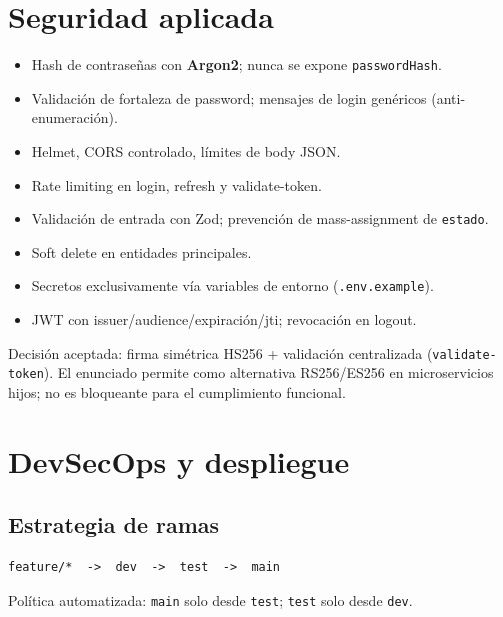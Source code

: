 \documentclass[12pt,a4paper]{article}
\begin{document}
\section{Seguridad aplicada}
\begin{itemize}[leftmargin=1.5em]
  \item Hash de contraseñas con \textbf{Argon2}; nunca se expone \texttt{passwordHash}.
  \item Validación de fortaleza de password; mensajes de login genéricos
        (anti-enumeración).
  \item Helmet, CORS controlado, límites de body JSON.
  \item Rate limiting en login, refresh y validate-token.
  \item Validación de entrada con Zod; prevención de mass-assignment de
        \texttt{estado}.
  \item Soft delete en entidades principales.
  \item Secretos exclusivamente vía variables de entorno (\texttt{.env.example}).
  \item JWT con issuer/audience/expiración/jti; revocación en logout.
\end{itemize}

Decisión aceptada: firma simétrica HS256 + validación centralizada
(\texttt{validate-token}). El enunciado permite como alternativa RS256/ES256
en microservicios hijos; no es bloqueante para el cumplimiento funcional.

\section{DevSecOps y despliegue}
\subsection{Estrategia de ramas}
\begin{lstlisting}
feature/*  ->  dev  ->  test  ->  main
\end{lstlisting}
Política automatizada: \texttt{main} solo desde \texttt{test}; \texttt{test} solo desde \texttt{dev}.
\end{document}
